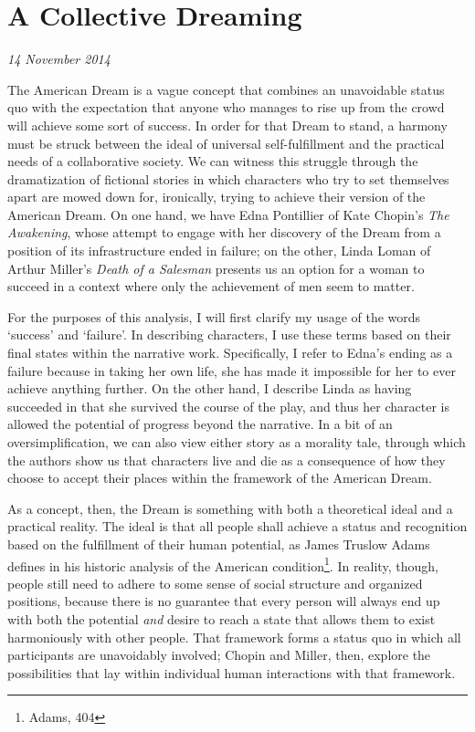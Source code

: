 \section{A Collective Dreaming}

\textit{14 November 2014}

The American Dream is a vague concept that combines an unavoidable status quo
with the expectation that anyone who manages to rise up from the crowd will
achieve some sort of success. In order for that Dream to stand, a harmony must
be struck between the ideal of universal self-fulfillment and the practical
needs of a collaborative society. We can witness this struggle through the
dramatization of fictional stories in which characters who try to set themselves
apart are mowed down for, ironically, trying to achieve their version of the
American Dream. On one hand, we have Edna Pontillier of Kate Chopin's
\textit{The Awakening}, whose attempt to engage with her discovery of the Dream
from a position of its infrastructure ended in failure; on the other, Linda
Loman of Arthur Miller's \textit{Death of a Salesman} presents us an option for
a woman to succeed in a context where only the achievement of men seem to
matter.

For the purposes of this analysis, I will first clarify my usage of the words
`success' and `failure'. In describing characters, I use these terms based on
their final states within the narrative work. Specifically, I refer to Edna's
ending as a failure because in taking her own life, she has made it impossible
for her to ever achieve anything further. On the other hand, I describe Linda as
having succeeded in that she survived the course of the play, and thus her
character is allowed the potential of progress beyond the narrative.  In a bit
of an oversimplification, we can also view either story as a morality tale,
through which the authors show us that characters live and die as a consequence
of how they choose to accept their places within the framework of the American
Dream.

As a concept, then, the Dream is something with both a theoretical ideal and a
practical reality.  The ideal is that all people shall achieve a status and
recognition based on the fulfillment of their human potential, as James Truslow
Adams defines in his historic analysis of the American condition\footnote{Adams,
404}. In reality, though, people still need to adhere to some sense of social
structure and organized positions, because there is no guarantee that every
person will always end up with both the potential \textit{and} desire to reach a
state that allows them to exist harmoniously with other people. That framework
forms a status quo in which all participants are unavoidably involved; Chopin
and Miller, then, explore the possibilities that lay within individual human
interactions with that framework.

